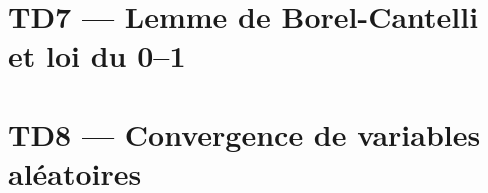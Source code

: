 \documentclass[french,a4paper,10pt]{article}
\begin{document}
    \newpage
    \section*{TD7 --- Lemme de Borel-Cantelli et loi du 0--1}\label{sec:TD7}
    \setcounter{section}{7}
    \setcounter{tdcounter}{0}
    

    \newpage
    \section*{TD8 --- Convergence de variables aléatoires}\label{sec:TD8}
    \setcounter{section}{8}
    \setcounter{tdcounter}{0}
    
\end{document}
